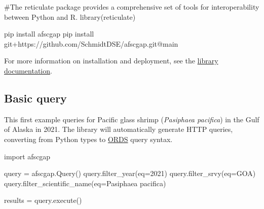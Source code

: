 \documentclass[
  letterpaper,
  oneside,
  open=any]{scrbook}
\newenvironment{Shaded}{\begin{snugshade}}{\end{snugshade}}
\newcommand{\AttributeTok}[1]{\textcolor[rgb]{0.40,0.45,0.13}{#1}}
\newcommand{\CommentTok}[1]{\textcolor[rgb]{0.37,0.37,0.37}{#1}}
\newcommand{\DecValTok}[1]{\textcolor[rgb]{0.68,0.00,0.00}{#1}}
\newcommand{\ErrorTok}[1]{\textcolor[rgb]{0.68,0.00,0.00}{#1}}
\newcommand{\FunctionTok}[1]{\textcolor[rgb]{0.28,0.35,0.67}{#1}}
\newcommand{\NormalTok}[1]{\textcolor[rgb]{0.00,0.23,0.31}{#1}}
\newcommand{\OtherTok}[1]{\textcolor[rgb]{0.00,0.23,0.31}{#1}}
\newcommand{\SpecialCharTok}[1]{\textcolor[rgb]{0.37,0.37,0.37}{#1}}
\newcommand{\StringTok}[1]{\textcolor[rgb]{0.13,0.47,0.30}{#1}}
\begin{document}
\begin{Shaded}
\begin{Highlighting}[]
\CommentTok{\#The reticulate package provides a comprehensive set of tools for interoperability between Python and R. }
\FunctionTok{library}\NormalTok{(reticulate)}
\end{Highlighting}
\end{Shaded}

\begin{Shaded}
\begin{Highlighting}[]
\NormalTok{pip install afscgap}
\NormalTok{pip install git}\SpecialCharTok{+}\NormalTok{https}\SpecialCharTok{:}\ErrorTok{//}\NormalTok{github.com}\SpecialCharTok{/}\NormalTok{SchmidtDSE}\SpecialCharTok{/}\NormalTok{afscgap.git}\SpecialCharTok{@}\NormalTok{main}
\end{Highlighting}
\end{Shaded}

For more information on installation and deployment, see the
\href{https://pyafscgap.org}{library documentation}.

\subsection{Basic query}\label{basic-query}

This first example queries for Pacific glass shrimp (\emph{Pasiphaea
pacifica}) in the Gulf of Alaska in 2021. The library will automatically
generate HTTP queries, converting from Python types to
\href{https://www.oracle.com/database/technologies/appdev/rest.html}{ORDS}
query syntax.

\begin{Shaded}
\begin{Highlighting}[]
\NormalTok{import afscgap}

\NormalTok{query }\OtherTok{=} \FunctionTok{afscgap.Query}\NormalTok{()}
\FunctionTok{query.filter\_year}\NormalTok{(}\AttributeTok{eq=}\DecValTok{2021}\NormalTok{)}
\FunctionTok{query.filter\_srvy}\NormalTok{(}\AttributeTok{eq=}\StringTok{\textquotesingle{}GOA\textquotesingle{}}\NormalTok{)}
\FunctionTok{query.filter\_scientific\_name}\NormalTok{(}\AttributeTok{eq=}\StringTok{\textquotesingle{}Pasiphaea pacifica\textquotesingle{}}\NormalTok{)}

\NormalTok{results }\OtherTok{=} \FunctionTok{query.execute}\NormalTok{()}
\end{Highlighting}
\end{Shaded}
\end{document}
